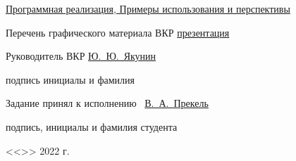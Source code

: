 \begin{spacing}{1}
{        \uline{Программная реализация, Примеры использования и перспективы \hfill}

        \uline{\hfill}

        \uline{\hfill}

        Перечень графического материала ВКР \uline{презентация\hfill}

        \uline{\hfill}

        \uline{\hfill}

        \uline{\hfill}

        \vfill

        Руководитель ВКР
        \hfill
        \uline{\hspace{10.5ex}}
        \hspace{6ex}
        \uline{Ю.~Ю.~Якунин}

        \vspace{-4pt}

        \hfill
        {\footnotesize подпись}
        \hspace{8.5ex}
        {\footnotesize инициалы и фамилия}

        Задание принял к исполнению~
        \hfill
        \uline{\hspace{18.5ex}В.~А.~Прекель}

        \vspace{-4pt}

        \hfill
        {\footnotesize подпись, инициалы и фамилия студента}

        \vspace{1em}

        \hfill <<\uline{\hspace{3ex}}>> \uline{\hspace{9ex}} 2022 г.
    }
\end{spacing}


\clearpage

\setcounter{page}{2}
